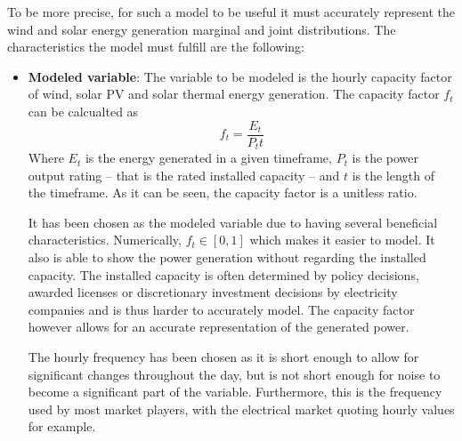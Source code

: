 To be more precise, for such a model to be useful it must accurately represent the wind and solar energy generation marginal and joint distributions. The characteristics the model must fulfill are the following:
\begin{itemize}
    \item \textbf{Modeled variable}: The variable to be modeled is the hourly capacity factor of wind, solar PV and solar thermal energy generation. The capacity factor $f_t$ can be calcualted as 
    \begin{equation}
        f_t=\frac{E_t}{P_t t}
    \end{equation}
    Where $E_t$ is the energy generated in a given timeframe, $P_t$ is the power output rating -- that is the rated installed capacity -- and $t$ is the length of the timeframe. As it can be seen, the capacity factor is a unitless ratio. 
    
    It has been chosen as the modeled variable due to having several beneficial characteristics. Numerically, $f_t \in \left[0,1\right]$ which makes it easier to model. It also is able to show the power generation without regarding the installed capacity. The installed capacity is often determined by policy decisions, awarded licenses or discretionary investment decisions by electricity companies and is thus harder to accurately model. The capacity factor however allows for an accurate representation of the generated power. 

    The hourly frequency has been chosen as it is short enough to allow for significant changes throughout the day, but is not short enough for noise to become a significant part of the variable. Furthermore, this is the frequency used by most market players, with the electrical market quoting hourly values for example. 


\end{itemize}

